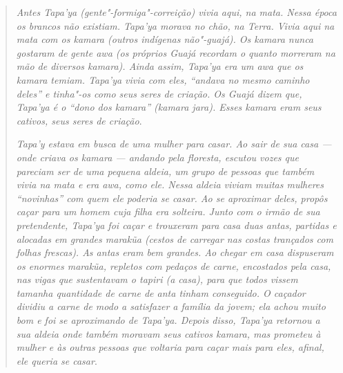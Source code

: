 \begin{quote}
\emph{Antes \emph{Tapa'ya} (gente"-formiga"-correição) vivia aqui, na mata.
Nessa época os brancos não existiam. \emph{Tapa'ya} morava no chão, na
Terra. Vivia aqui na mata com os \emph{kamara} (outros indígenas
não"-guajá). Os \emph{kamara} nunca gostaram de gente \emph{awa} (os
próprios Guajá recordam o quanto morreram na mão de diversos
\emph{kamara)}. Ainda assim, \emph{Tapa'ya} era um \emph{awa} que os
\emph{kamara} temiam. \emph{Tapa'ya} vivia com eles, ``andava no mesmo
caminho deles'' e tinha"-os como seus seres de criação. Os Guajá dizem
que, \emph{Tapa'ya} é o ``dono dos \emph{kamara}'' (\emph{kamara jara}).
Esses \emph{kamara} eram seus cativos, seus seres de criação}.

\noindent
\emph{\emph{Tapa'y} estava em busca de uma mulher para casar. Ao sair de sua
casa --- onde criava os \emph{kamara} --- andando pela floresta, escutou
vozes que pareciam ser de uma pequena aldeia, um grupo de pessoas que
também vivia na mata e era \emph{awa}, como ele. Nessa aldeia viviam
muitas mulheres ``novinhas'' com quem ele poderia se casar. Ao se
aproximar deles, propôs caçar para um homem cuja filha era solteira.
Junto com o irmão de sua pretendente, \emph{Tapa'ya} foi caçar e
trouxeram para casa duas antas, partidas e alocadas em grandes
\emph{marakũa} (cestos de carregar nas costas trançados com folhas
frescas). As antas eram bem grandes. Ao chegar em casa dispuseram os
enormes \emph{marakũa}, repletos com pedaços de carne, encostados pela
casa, nas vigas que sustentavam o tapiri (a casa), para que todos vissem
tamanha quantidade de carne de anta tinham conseguido. O caçador dividiu
a carne de modo a satisfazer a família da jovem; ela achou muito bom e
foi se aproximando de \emph{Tapa'ya}. Depois disso, \emph{Tapa'ya}
retornou a sua aldeia onde também moravam seus cativos \emph{kamara},
mas prometeu à mulher e às outras pessoas que voltaria para caçar mais
para eles, afinal, ele queria se casar}.


\end{quote}
